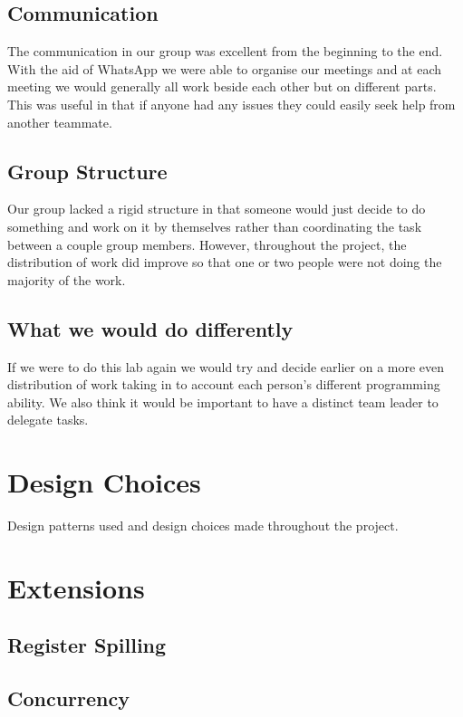 \documentclass{article}
\begin{document}
\subsection{Communication}
The communication in our group was excellent from the beginning to the end. With the aid of WhatsApp we were able to organise our meetings and at each meeting we would generally all work beside each other but on different parts. This was useful in that if anyone had any issues they could easily seek help from another teammate. 

\subsection{Group Structure}
Our group lacked a rigid structure in that someone would just decide to do something and work on it by themselves rather than coordinating the task between a couple group members. However, throughout the project, the distribution of work did improve so that one or two people were not doing the majority of the work.

\subsection{What we would do differently}
If we were to do this lab again we would try and decide earlier on a more even distribution of work taking in to account each person's different programming ability. We also think it would be important to have a distinct team leader to delegate tasks.

\section{Design Choices}
Design patterns used and design choices made throughout the project.

\section{Extensions}
\subsection{Register Spilling}
\subsection{Concurrency}
\end{document}
